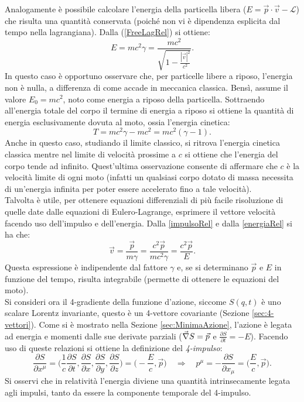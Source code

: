 Analogamente è possibile calcolare l'energia della particella libera ($E = \vec{p}\cdot\vec{v}-\mathcal{L} $) che risulta una quantità conservata (poiché non vi è dipendenza esplicita dal tempo nella lagrangiana). Dalla (\ref{FreeLagRel}) si ottiene:
\begin{equation}
    E = mc^2\gamma=\frac{mc^2}{\sqrt{1-\frac{|\vec{v}|^2}{c^2}}}.\label{energiaRel}
\end{equation}
In questo caso è opportuno osservare che, per particelle libere a riposo, l'energia non è nulla, a differenza di come accade in meccanica classica. Bensì, assume il valore $E_0=mc^2$, noto come energia a riposo della particella. Sottraendo all'energia totale del corpo il termine di energia a riposo si ottiene la quantità di energia esclusivamente dovuta al moto, ossia l'energia cinetica:
\begin{equation}
    T=mc^2\gamma-mc^2=mc^2(\gamma-1).
\end{equation}
Anche in questo caso, studiando il limite classico, si ritrova l'energia cinetica classica mentre nel limite di velocità prossime a $c$ si ottiene che l'energia del corpo tende ad infinito. Quest'ultima osservazione consente di affermare che $c$ è la velocità limite di ogni moto (infatti un qualsiasi corpo dotato di massa necessita di un'energia infinita per poter essere accelerato fino a tale velocità).\\

Talvolta è utile, per ottenere equazioni differenziali di più facile risoluzione di quelle date dalle equazioni di Eulero-Lagrange, esprimere il vettore velocità facendo uso dell'impulso e dell'energia. Dalla \eqref{impulsoRel} e dalla \eqref{energiaRel} si ha che:
\begin{equation}
    \vec v=\frac{\vec p}{m\gamma}=\frac{c^2\vec p}{mc^2\gamma}=\frac{c^2\vec p}{E}.\label{velPE}
\end{equation}    
Questa espressione è indipendente dal fattore $\gamma$ e, se si determinano $\vec p$ e $E$ in funzione del tempo, risulta integrabile (permette di ottenere le equazioni del moto).\\

Si consideri ora il 4-gradiente della funzione d'azione, siccome $S(q,t)$ è uno scalare Lorentz invariante, questo è un 4-vettore covariante (Sezione \ref{sec:4-vettori}). Come si è mostrato nella Sezione \ref{sec:MinimaAzione}, l'azione è legata ad energia e momenti dalle sue derivate parziali ($\vec{\nabla} S=\vec{p}$ e $\frac{\partial S }{\partial t}=-E$). Facendo uso di queste relazioni si ottiene la definizione del \emph{4-impulso}:
\begin{equation}
   \frac{\partial S}{\partial x^\mu}= \bigg(\frac{1}{c}\frac{\partial S }{\partial t},\frac{\partial S }{\partial x},\frac{\partial S }{\partial y},\frac{\partial S }{\partial z}\bigg)=\bigg(-\frac{E}{c},\vec{p}\bigg)\quad \Rightarrow \quad
   p^\mu=-\frac{\partial S }{\partial x_\mu}=\bigg(\frac{E}{c},\vec{p}\bigg).
\end{equation}
Si osservi che in relatività l'energia diviene una quantità intrinsecamente legata agli impulsi, tanto da essere la componente temporale del 4-impulso.\\

